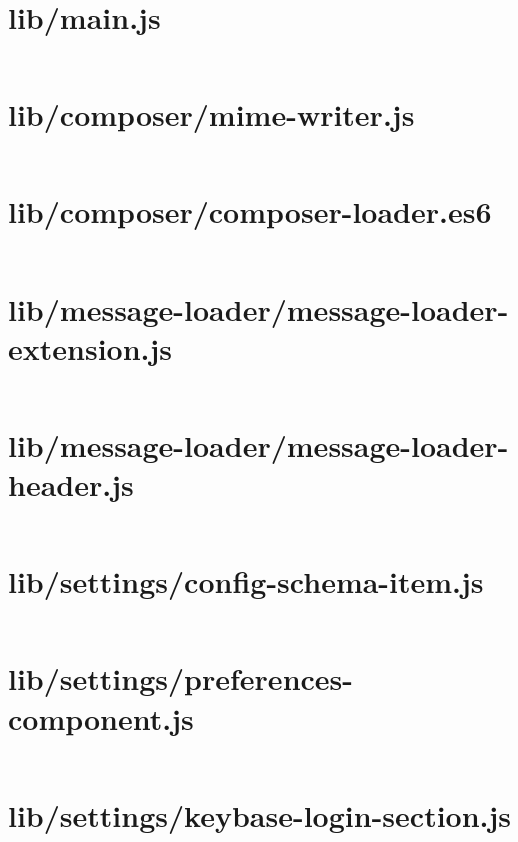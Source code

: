 \documentclass[10pt, letterpaper]{article}
\begin{document}

\setcounter{page}{13}

\section{lib/main.js}
\inputminted{javascript}{/home/mbilker/.nylas/dev/packages/cypher/lib/main.js}

\section{lib/composer/mime-writer.js}
\inputminted{javascript}{/home/mbilker/.nylas/dev/packages/cypher/lib/composer/mime-writer.js}

\section{lib/composer/composer-loader.es6}
\inputminted{javascript}{/home/mbilker/.nylas/dev/packages/cypher/lib/composer/composer-loader.es6}

\section{lib/message-loader/message-loader-extension.js}
\inputminted{javascript}{/home/mbilker/.nylas/dev/packages/cypher/lib/message-loader/message-loader-extension.js}

\section{lib/message-loader/message-loader-header.js}
\inputminted{javascript}{/home/mbilker/.nylas/dev/packages/cypher/lib/message-loader/message-loader-header.js}

\section{lib/settings/config-schema-item.js}
\inputminted{javascript}{/home/mbilker/.nylas/dev/packages/cypher/lib/settings/config-schema-item.js}

\section{lib/settings/preferences-component.js}
\inputminted{javascript}{/home/mbilker/.nylas/dev/packages/cypher/lib/settings/preferences-component.js}

\section{lib/settings/keybase-login-section.js}
\inputminted{javascript}{/home/mbilker/.nylas/dev/packages/cypher/lib/settings/keybase-login-section.js}
\end{document}
